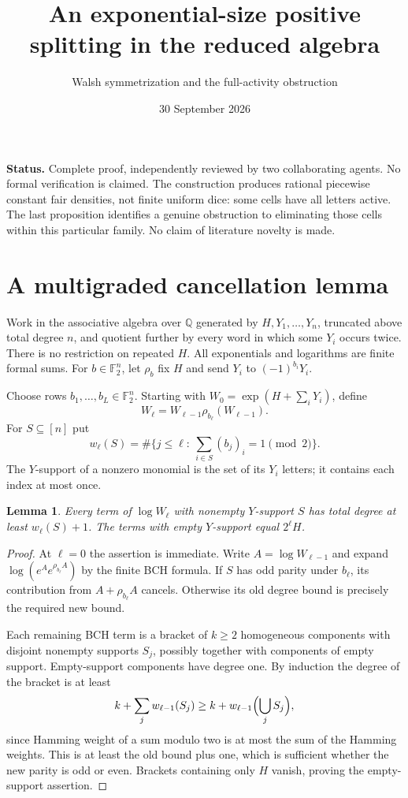 \documentclass[11pt]{article}
\title{An exponential-size positive splitting in the reduced algebra}
\author{Walsh symmetrization and the full-activity obstruction}
\date{30 September 2026}
\newtheorem{lemma}[theorem]{Lemma}
\begin{document}
\maketitle
\noindent\textbf{Status.} Complete proof, independently reviewed by two collaborating agents.
No formal verification is claimed. The construction
produces rational piecewise constant fair densities, not finite uniform
dice: some cells have all letters active. The last proposition identifies
a genuine obstruction to eliminating those cells within this particular
family. No claim of literature novelty is made.

\section*{A multigraded cancellation lemma}
Work in the associative algebra over $\mathbb Q$ generated by
$H,Y_1,\ldots,Y_n$, truncated above total degree $n$, and quotient further
by every word in which some $Y_i$ occurs twice. There is no restriction
on repeated $H$. All exponentials and logarithms are finite formal sums.
For $b\in\mathbb F_2^n$, let $\rho_b$ fix $H$ and send
$Y_i$ to $(-1)^{b_i}Y_i$.

Choose rows $b_1,\ldots,b_L\in\mathbb F_2^n$. Starting with
$W_0=\exp(H+\sum_iY_i)$, define
\[
 W_\ell=W_{\ell-1}\rho_{b_\ell}(W_{\ell-1}).
\]
For $S\subseteq[n]$ put
\[
 w_\ell(S)=\#\{j\le\ell:\ \sum_{i\in S}(b_j)_i=1\pmod2\}.
\]
The $Y$-support of a nonzero monomial is the set of its $Y_i$ letters;
it contains each index at most once.

\begin{lemma}\label{cancel}
Every term of $\log W_\ell$ with nonempty $Y$-support $S$ has total
degree at least $w_\ell(S)+1$. The terms with empty $Y$-support equal
$2^\ell H$.
\end{lemma}
\begin{proof}
At $\ell=0$ the assertion is immediate. Write $A=\log W_{\ell-1}$
and expand $\log(e^A e^{\rho_{b_\ell}A})$ by the finite BCH formula.
If $S$ has odd parity under $b_\ell$, its contribution from
$A+\rho_{b_\ell}A$ cancels. Otherwise its old degree bound is precisely
the required new bound.

Each remaining BCH term is a bracket of $k\ge2$ homogeneous components
with disjoint nonempty supports $S_j$, possibly together with components
of empty support. Empty-support components have degree one. By induction
the degree of the bracket is at least
\[
 k+\sum_j w_{\ell-1}(S_j)
 \ge k+w_{\ell-1}\Bigl(\bigcup_jS_j\Bigr),
\]
since Hamming weight of a sum modulo two is at most the sum of the
Hamming weights. This is at least the old bound plus one, which is
sufficient whether the new parity is odd or even. Brackets containing
only $H$ vanish, proving the empty-support assertion.
\end{proof}
\end{document}
